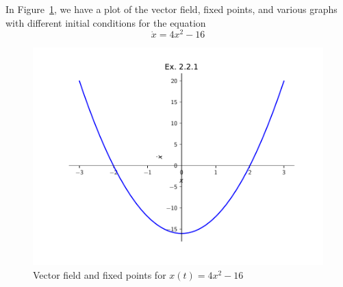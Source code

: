 
In Figure~\ref{fig2_2_1vecfield}, we have a plot of the vector field, fixed points,
and various graphs with different initial conditions for the equation 
\[
    \dot{x} = 4x^2 - 16
\]
\begin{figure}[!ht]
    \includegraphics[scale=0.6, center]{../plots/ch02/ex2_2_1.pdf}
    \caption{Vector field and fixed points for $x(t) = 4x^2 - 16$\label{fig2_2_1vecfield}}
\end{figure}
